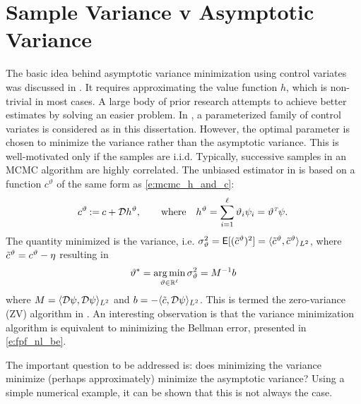 \section{Sample Variance v Asymptotic Variance}
\label{s:mcmc_var_vs_asym_var}
The basic idea behind asymptotic variance minimization using control variates was discussed in . It requires approximating the value function $h$, which is non-trivial in most cases. A large body of prior research \cite{mirsolimp13, oatgircho,papmirgir14} attempts to achieve better estimates by solving an easier problem. In \cite{papmirgir14}, a parameterized family of control variates is considered as in this dissertation. However, the optimal parameter is chosen to minimize the variance rather than the asymptotic variance. This is well-motivated only  if the samples are i.i.d. Typically, successive samples in an MCMC algorithm are highly correlated. 
The unbiased estimator in \cite{papmirgir14} is based on a function $c^{\vartheta}$ of the same form as \eqref{e:mcmc_h_and_c}:
\[
\begin{aligned}
c^\vartheta  \mathbin{:=} c + {\cal D} h^\vartheta,
\qquad
\text{where}
\quad
h^\vartheta  =  \sum_{i=1}^\ell \vartheta_i \psi_i = \vartheta^{\hbox{\tiny\it T}} \psi.\,
\end{aligned}
\]
The quantity minimized is the variance, i.e. $\sigma^2_{\vartheta} = {\sf E}[(\tilde c^\vartheta)^2] = \langle \tilde c^\vartheta, \tilde c^\vartheta \rangle_{L^2}$, where $\tilde c^\vartheta = c^\vartheta - \eta$ resulting in
\begin{equation}
\vartheta^*= \argmin_{\vartheta \in \Re^\ell} \sigma^2_\vartheta  = M^{-1} b
\label{e:mcmc_var_theta_star}
\end{equation}
where $M = \langle {\cal D} \psi,  {\cal D} \psi \rangle_{L^2}$ and $b = - \langle \tilde c, {\cal D} \psi \rangle_{L^2}$. This is termed the zero-variance (ZV) algorithm in \cite{papmirgir14}. An interesting observation is that the variance minimization algorithm is equivalent to minimizing the Bellman error, presented in \eqref{e:fpf_nl_be}.

The important question to be addressed is: does minimizing the variance minimize (perhaps approximately) minimize the asymptotic variance? Using a simple numerical example, it can be shown that this is not always the case.

